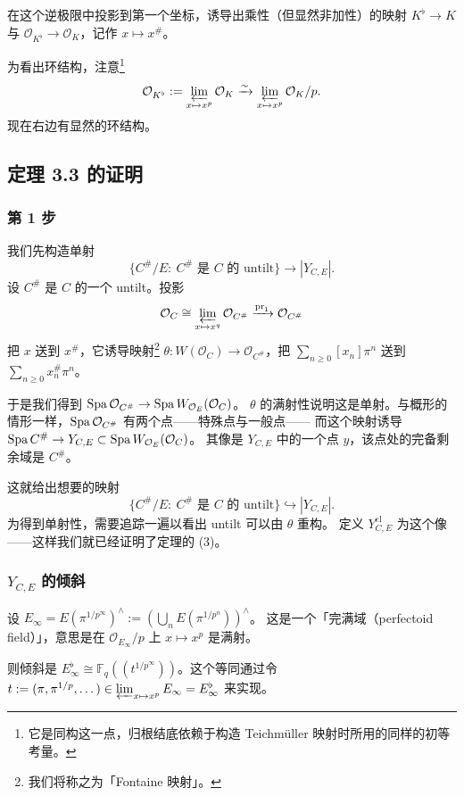 在这个逆极限中投影到第一个坐标，诱导出乘性（但显然非加性）的映射
$K^\flat\to K$ 与 $\mathcal{O}_{K^\flat}\to\mathcal{O}_K$，记作 $x\mapsto x^\#$。

为看出环结构，注意\footnote{它是同构这一点，归根结底依赖于构造 Teichmüller 映射时所用的同样的初等考量。}
\[
\mathcal{O}_{K^\flat}:=\varprojlim_{x\mapsto x^p}\mathcal{O}_K
\xrightarrow{\sim}\varprojlim_{x\mapsto x^p}\mathcal{O}_K/p .
\]
现在右边有显然的环结构。

\subsection{定理 3.3 的证明}

\subsubsection{第 1 步}

我们先构造单射
\[
\{C^\#/E:\ C^\#\text{ 是 }C\text{ 的 untilt}\}\longrightarrow|Y_{C,E}|.
\]
设 $C^\#$ 是 $C$ 的一个 untilt。投影
\[
\mathcal{O}_C\cong\varprojlim_{x\mapsto x^q}\mathcal{O}_{C^\#}
\xrightarrow{\mathrm{pr}_1}\mathcal{O}_{C^\#}
\]
把 $x$ 送到 $x^\#$，它诱导映射\footnote{我们将称之为「Fontaine 映射」。}
$\theta:W(\mathcal{O}_C)\to\mathcal{O}_{C^\#}$，把 $\sum_{n\ge0}[x_n]\pi^n$ 送到
$\sum_{n\ge0}x_n^\#\pi^n$。

于是我们得到 $\operatorname{Spa}\mathcal{O}_{C^\#}\to\operatorname{Spa} W_{\mathcal{O}_E}(\mathcal{O}_C)$。
$\theta$ 的满射性说明这是单射。与概形的情形一样，$\operatorname{Spa}\mathcal{O}_{C^\#}$ 有两个点——特殊点与一般点——
而这个映射诱导 $\operatorname{Spa} C^\#\to Y_{C,E}\subset\operatorname{Spa} W_{\mathcal{O}_E}(\mathcal{O}_C)$。
其像是 $Y_{C,E}$ 中的一个点 $y$，该点处的完备剩余域是 $C^\#$。

这就给出想要的映射
\[
\{C^\#/E:\ C^\#\text{ 是 }C\text{ 的 untilt}\}\hookrightarrow|Y_{C,E}|.
\]
为得到单射性，需要追踪一遍以看出 untilt 可以由 $\theta$ 重构。
定义 $Y^{\mathrm{cl}}_{C,E}$ 为这个像——这样我们就已经证明了定理的 (3)。

\subsubsection{$Y_{C,E}$ 的倾斜}

设 $E_\infty=E(\pi^{1/p^\infty})^\wedge:=(\bigcup_n E(\pi^{1/p^n}))^\wedge$。
这是一个「完满域（perfectoid field）」，意思是在 $\mathcal{O}_{E_\infty}/p$ 上 $x\mapsto x^p$ 是满射。

则倾斜是 $E^\flat_\infty\cong\mathbb{F}_q((t^{1/p^\infty}))$。这个等同通过令
$t:=(\pi,\pi^{1/p},\dots)\in\varprojlim_{x\mapsto x^p}E_\infty=E^\flat_\infty$ 来实现。


